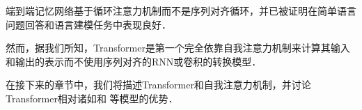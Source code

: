 端到端记忆网络基于循环注意力机制而不是序列对齐循环，并已被证明在简单语言问题回答和语言建模任务中表现良好．\citep{sukhbaatar2015}


然而，据我们所知，Transformer是第一个完全依靠自我注意力机制来计算其输入和输出的表示而不使用序列对齐的RNN或卷积的转换模型．


在接下来的章节中，我们将描述Transformer和自我注意力机制，并讨论Transformer相对诸如\citep{neural_gpu, NalBytenet2017}和 \citep{JonasFaceNet2017}等模型的优势．





